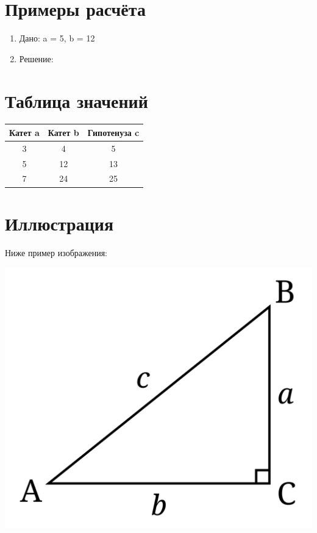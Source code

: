 \documentclass{article}
\begin{document}
\section{Примеры расчёта}
\begin{center}
\end{center}
\begin{center}
\end{center}
\begin{enumerate}
\item Дано: a = 5, b = 12
\item Решение:
\end{enumerate}
\begin{center}
\end{center}

\section{Таблица значений}
\begin{center}
\begin{tabular}{|c|c|c|}
\hline
Катет a & Катет b & Гипотенуза c \\
\hline
3 & 4 & 5 \\
\hline
5 & 12 & 13 \\
\hline
7 & 24 & 25 \\
\hline
\end{tabular}
\end{center}

\section{Иллюстрация}
\newline Ниже пример изображения:
\begin{center}
\includegraphics[width=0.5\linewidth]{305-d805be53ab2d1978159d403df90369a4.png}
\end{center}
\end{document}
